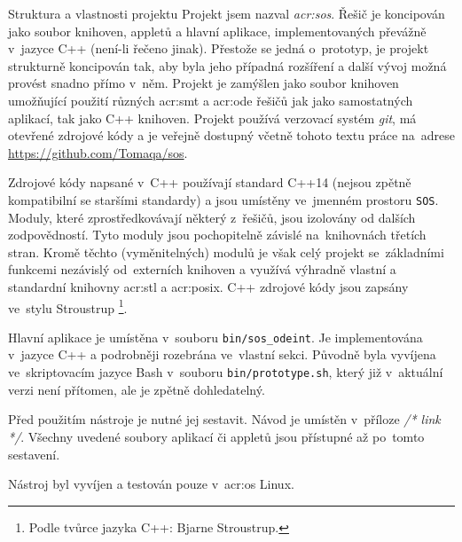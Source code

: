 \documentclass[thesis=M,czech]{FITthesis}[2012/06/26]
\newcommand{\acrlabel}[1]{acr:#1}
\newcommand{\acr}[1]{\acrshort{\acrlabel{#1}}}
\newcommand{\acrf}[1]{\acrfull{\acrlabel{#1}}}
\newcommand{\cmt}[1]{\textit{/* #1 */}}
\newcommand{\id}[1]{\texttt{#1}}
\newcommand{\hl}[1]{\textit{#1}}
\newcommand{\name}[1]{\hl{#1}}
\newcommand{\binDir}{\id{bin}}
\newcommand{\binFn}[1]{\id{\binDir{}/\-#1}}
\begin{document}
\begin{section}{Struktura a vlastnosti projektu}\label{s:impl:proj}
Projekt jsem nazval \name{\acrf{sos}}.
Řešič je koncipován
jako soubor knihoven, appletů a hlavní aplikace,
implementovaných převážně v~jazyce C++ (není-li řečeno jinak).
Přestože se jedná o~prototyp, je projekt strukturně koncipován tak,
aby byla jeho případná rozšíření a další vývoj
možná provést snadno přímo v~něm.
Projekt je zamýšlen jako soubor knihoven
umožňující použití různých \acr{smt} a \acr{ode}
řešičů jak jako samostatných aplikací, tak jako C++ knihoven.
Projekt používá verzovací systém \name{git},
má otevřené zdrojové kódy
a je veřejně dostupný včetně tohoto textu práce na~adrese
\url{https://github.com/Tomaqa/sos}.

Zdrojové kódy napsané v~C++ používají standard C++14
(nejsou zpětně kompatibilní se staršími standardy)
a jsou umístěny ve~jmenném prostoru \id{SOS}.
Moduly, které zprostředkovávají některý z~řešičů,
jsou izolovány od dalších zodpovědností.
Tyto moduly jsou pochopitelně závislé na~knihovnách třetích stran.
Kromě těchto (vyměnitelných) modulů je však celý projekt
se~základními funkcemi
nezávislý od~externích knihoven a využívá výhradně
vlastní a standardní knihovny \acr{stl}
a \acr{posix}.
C++ zdrojové kódy jsou zapsány ve~stylu Stroustrup%
\footnote{Podle tvůrce jazyka C++: Bjarne Stroustrup.}.

Hlavní aplikace je umístěna v~souboru \binFn{sos\_\-odeint}.
Je implementována v~jazyce C++
a podrobněji rozebrána ve~vlastní sekci.
Původně byla vyvíjena ve~skriptovacím jazyce Bash
v~souboru \binFn{prototype.sh},
který již v~aktuální verzi není přítomen,
ale je zpětně dohledatelný.

Před použitím nástroje je nutné jej sestavit.
Návod je umístěn v~příloze \cmt{link}.
Všechny uvedené soubory aplikací či appletů
jsou přístupné až po~tomto sestavení.

Nástroj byl vyvíjen a testován pouze v~\acr{os} Linux.
\end{section} %

\end{document}

